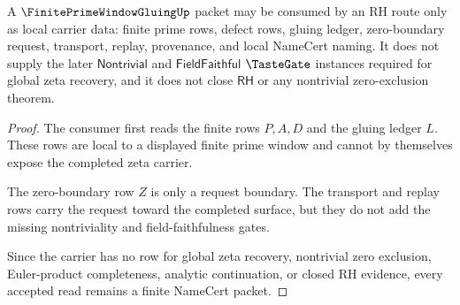 \begin{theorem}
\label{thm:finite-prime-window-gluing-boundary}
A $\FinitePrimeWindowGluingUp$ packet may be consumed by an RH route only as local carrier data: finite prime rows, defect rows, gluing ledger, zero-boundary request, transport, replay, provenance, and local NameCert naming. It does not supply the later $\mathsf{Nontrivial}$ and $\mathsf{FieldFaithful}$ $\TasteGate$ instances required for global zeta recovery, and it does not close $\mathsf{RH}$ or any nontrivial zero-exclusion theorem.
\end{theorem}
\begin{proof}
The consumer first reads the finite rows $P,A,D$ and the gluing ledger $L$. These rows are local to a displayed finite prime window and cannot by themselves expose the completed zeta carrier.

The zero-boundary row $Z$ is only a request boundary. The transport and replay rows carry the request toward the completed surface, but they do not add the missing nontriviality and field-faithfulness gates.

Since the carrier has no row for global zeta recovery, nontrivial zero exclusion, Euler-product completeness, analytic continuation, or closed RH evidence, every accepted read remains a finite NameCert packet.
\end{proof}





